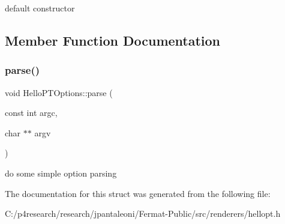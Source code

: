 default constructor 

\subsection{Member Function Documentation}
\mbox{\label{struct_hello_p_t_options_a540d006dee6aff8ee5e8b3cfc8b0fa0b}} 
\subsubsection{\texorpdfstring{parse()}{parse()}}
{\footnotesize\ttfamily void Hello\+P\+T\+Options\+::parse (\begin{DoxyParamCaption}\item[{const int}]{argc,  }\item[{char $\ast$$\ast$}]{argv }\end{DoxyParamCaption})\hspace{0.3cm}{\ttfamily [inline]}}

do some simple option parsing 

The documentation for this struct was generated from the following file\+:\begin{DoxyCompactItemize}
\item 
C\+:/p4research/research/jpantaleoni/\+Fermat-\/\+Public/src/renderers/hellopt.\+h\end{DoxyCompactItemize}
